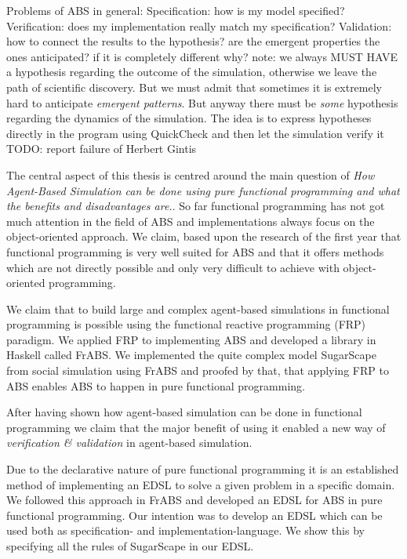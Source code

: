 Problems of ABS in general:
Specification: how is my model specified? 
Verification: does my implementation really match my specification? 
Validation: how to connect the results to the hypothesis? are the emergent properties the ones anticipated? if it is completely different why? note: we always MUST HAVE a hypothesis regarding the outcome of the simulation, otherwise we leave the path of scientific discovery. But we must admit that sometimes it is extremely hard to anticipate \textit{emergent patterns}. But anyway there must be \textit{some} hypothesis regarding the dynamics of the simulation.
The idea is to express hypotheses directly in the program using QuickCheck and then let the simulation verify it
TODO: report failure of Herbert Gintis



The central aspect of this thesis is centred around the main question of \textit{How Agent-Based Simulation can be done using pure functional programming and what the benefits and disadvantages are.}. So far functional programming has not got much attention in the field of ABS and implementations always focus on the object-oriented approach. We claim, based upon the research of the first year that functional programming is very well suited for ABS and that it offers methods which are not directly possible and only very difficult to achieve with object-oriented programming.

We claim that to build large and complex agent-based simulations in functional programming is possible using the functional reactive programming (FRP) paradigm. We applied FRP to implementing ABS and developed a library in Haskell called FrABS. We implemented the quite complex model SugarScape from social simulation using FrABS and proofed by that, that applying FRP to ABS enables ABS to happen in pure functional programming.

After having shown how agent-based simulation can be done in functional programming we claim that the major benefit of using it enabled a new way of \textit{verification \& validation} in agent-based simulation. 

Due to the declarative nature of pure functional programming it is an established method of implementing an EDSL to solve a given problem in a specific domain. We followed this approach in FrABS and developed an EDSL for ABS in pure functional programming. Our intention was to develop an EDSL which can be used both as specification- and implementation-language. We show this by specifying all the rules of SugarScape in our EDSL.

